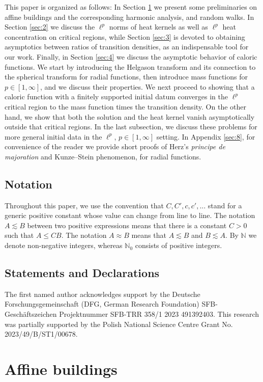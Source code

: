 \documentclass[11pt]{amsart}
\newcommand{\NN}{\mathbb{N}}
\theoremstyle{plain}
\theoremstyle{definition}
\numberwithin{equation}{section}
\begin{document}
This paper is organized as follows: In Section \ref{sec:1} we present some preliminaries on affine buildings and the 
corresponding harmonic analysis, and random walks. In Section \ref{sec:2} we discuss the $\ell^p$ norms of heat kernels as well 
as $\ell^p$ heat concentration on critical regions, while Section \ref{sec:3} is devoted to obtaining asymptotics between ratios
of transition densities, as an indispensable tool for our work. Finally, in Section \ref{sec:4} we discuss the asymptotic 
behavior of caloric functions. We start by introducing the Helgason transform and its connection to the spherical transform 
for radial functions, then introduce mass functions for $p \in [1, \infty]$, and we discuss their properties. We next proceed 
to showing that a caloric function with a finitely supported initial datum converges in the $\ell^p$ critical region to the mass
function times the transition density. On the other hand, we show that both the solution and the heat kernel vanish
asymptotically outside that critical regions. In the last subsection, we discuss these problems for more general initial 
data in the $\ell^p$, $p\in [1, \infty]$ setting. In Appendix \ref{sec:8}, for convenience of the reader we provide
short proofs of Herz's \emph{principe de majoration} and Kunze--Stein phenomenon, for radial functions. 

\subsection*{Notation} Throughout this paper, we use the convention that $C, C', c, c',...$ stand for a generic positive 
constant whose value can change from line to line. The notation $A\lesssim B$ between two positive expressions means that 
there is a constant $C>0$ such that $A \leqslant C B$. The notation $A\approx B$ means that $A\lesssim B$ and $B\lesssim A$.
By $\NN$ we denote non-negative integers, whereas $\NN_0$ consists of positive integers.

\subsection*{Statements and Declarations}
The first named author acknowledges support by the Deutsche Forschungsgemeinschaft (DFG, German Research Foundation) 
SFB-Geschäftszeichen Projektnummer SFB-TRR 358/1 2023 491392403. This research was partially supported by the Polish National 
Science Centre Grant No. 2023/49/B/ST1/00678. 

\section{Affine buildings}
\label{sec:1}
	
\end{document}

